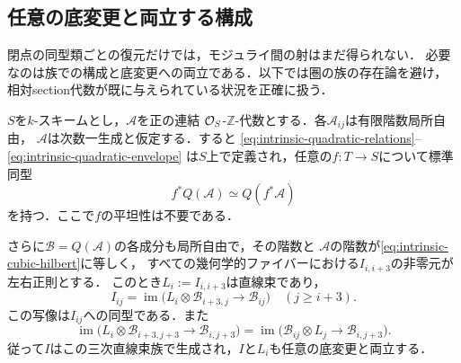 \subsection{任意の底変更と両立する構成}

閉点の同型類ごとの復元だけでは，モジュライ間の射はまだ得られない．
必要なのは族での構成と底変更への両立である．以下では圏の族の存在論を避け，
相対section代数が既に与えられている状況を正確に扱う．

\begin{theorem}[二次包絡と三次イデアルの相対復元]
\label{thm:intrinsic-relative-envelope}
$S$を$k$-スキームとし，$\mathcal A$を正の連結
$\mathcal O_S$-$\mathbb Z$-代数とする．各$\mathcal A_{ij}$は有限階数局所自由，
$\mathcal A$は次数一生成と仮定する．すると
\eqref{eq:intrinsic-quadratic-relations}--\eqref{eq:intrinsic-quadratic-envelope}
は$S$上で定義され，任意の$f:T\to S$について標準同型
\begin{equation}\label{eq:intrinsic-base-change}
 f^*Q(\mathcal A)\simeq Q(f^*\mathcal A)
\end{equation}
を持つ．ここで$f$の平坦性は不要である．

さらに$\mathcal B=Q(\mathcal A)$の各成分も局所自由で，その階数と
$\mathcal A$の階数が\eqref{eq:intrinsic-cubic-hilbert}に等しく，
すべての幾何学的ファイバーにおける$I_{i,i+3}$の非零元が左右正則とする．
このとき$L_i:=I_{i,i+3}$は直線束であり，
\begin{equation}\label{eq:intrinsic-relative-ideal}
 I_{ij}=\operatorname{im}\bigl(L_i\otimes\mathcal B_{i+3,j}
                  \longrightarrow\mathcal B_{ij}\bigr)\quad(j\geq i+3).
\end{equation}
この写像は$I_{ij}$への同型である．また
\begin{equation}\label{eq:intrinsic-relative-normal}
 \operatorname{im}\bigl(L_i\otimes\mathcal B_{i+3,j+3}
                   \longrightarrow\mathcal B_{i,j+3}\bigr)
 =\operatorname{im}\bigl(\mathcal B_{ij}\otimes L_j
                   \longrightarrow\mathcal B_{i,j+3}\bigr).
\end{equation}
従って$I$はこの三次直線束族で生成され，$I$と$L_i$も任意の底変更と両立する．
\end{theorem}
